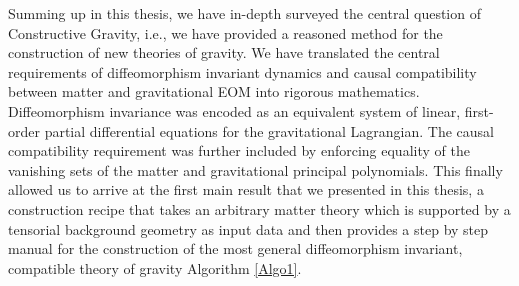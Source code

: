 Summing up in this thesis, we have in-depth surveyed the central question of Constructive Gravity, i.e., we have provided a reasoned method for the construction of new theories of gravity. We have translated the central requirements of diffeomorphism invariant dynamics and causal compatibility between matter and gravitational EOM into rigorous mathematics. Diffeomorphism invariance was encoded as an equivalent system of linear, first-order partial differential equations for the gravitational Lagrangian. The causal compatibility requirement was further included by enforcing equality of the vanishing sets of the matter and gravitational principal polynomials.
This finally allowed us to arrive at the first main result that we presented in this thesis, a construction recipe that takes an arbitrary matter theory which is supported by a tensorial background geometry as input data and then provides a step by step manual for the construction of the most general diffeomorphism invariant, compatible theory of gravity Algorithm \ref{Algo1}. 

